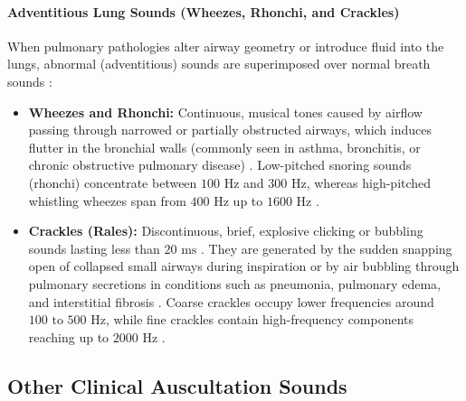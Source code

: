 \paragraph{Adventitious Lung Sounds (Wheezes, Rhonchi, and Crackles)}
When pulmonary pathologies alter airway geometry or introduce fluid into the lungs, abnormal (adventitious) sounds are superimposed over normal breath sounds \cite{pasterkamp1997respiratory, leng2015electronic}:
\begin{itemize}
    \item \textbf{Wheezes and Rhonchi:} Continuous, musical tones caused by airflow passing through narrowed or partially obstructed airways, which induces flutter in the bronchial walls (commonly seen in asthma, bronchitis, or chronic obstructive pulmonary disease) \cite{pasterkamp1997respiratory}. Low-pitched snoring sounds (rhonchi) concentrate between $100\text{ Hz}$ and $300\text{ Hz}$, whereas high-pitched whistling wheezes span from $400\text{ Hz}$ up to $1600\text{ Hz}$ \cite{pasterkamp1997respiratory, leng2015electronic}.
    \item \textbf{Crackles (Rales):} Discontinuous, brief, explosive clicking or bubbling sounds lasting less than $20\text{ ms}$ \cite{pasterkamp1997respiratory}. They are generated by the sudden snapping open of collapsed small airways during inspiration or by air bubbling through pulmonary secretions in conditions such as pneumonia, pulmonary edema, and interstitial fibrosis \cite{pasterkamp1997respiratory}. Coarse crackles occupy lower frequencies around $100\text{ to }500\text{ Hz}$, while fine crackles contain high-frequency components reaching up to $2000\text{ Hz}$ \cite{pasterkamp1997respiratory, leng2015electronic}.
\end{itemize}

\subsection{Other Clinical Auscultation Sounds}

